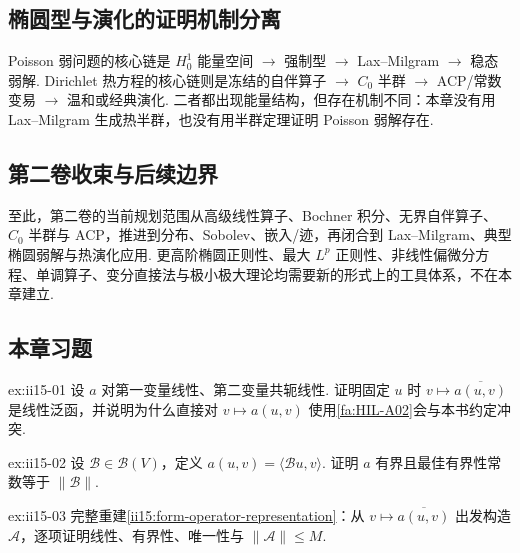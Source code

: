 \subsection{椭圆型与演化的证明机制分离}
Poisson 弱问题的核心链是 \(\displaystyle H_0^1\) 能量空间 \(\displaystyle\to\) 强制型 \(\displaystyle\to\) Lax--Milgram \(\displaystyle\to\) 稳态弱解. Dirichlet 热方程的核心链则是冻结的自伴算子 \(\displaystyle\to\) \(\displaystyle C_0\) 半群 \(\displaystyle\to\) ACP/常数变易 \(\displaystyle\to\) 温和或经典演化. 二者都出现能量结构，但存在机制不同：本章没有用 Lax--Milgram 生成热半群，也没有用半群定理证明 Poisson 弱解存在.

\subsection{第二卷收束与后续边界}
至此，第二卷的当前规划范围从高级线性算子、Bochner 积分、无界自伴算子、\(\displaystyle C_0\) 半群与 ACP，推进到分布、Sobolev、嵌入/迹，再闭合到 Lax--Milgram、典型椭圆弱解与热演化应用. 更高阶椭圆正则性、最大 \(\displaystyle L^p\) 正则性、非线性偏微分方程、单调算子、变分直接法与极小极大理论均需要新的形式上的工具体系，不在本章建立.

\subsection*{本章习题}\label{sec:ii15-exercises}

\begin{FAExercise}[半双线性的约定]{ex:ii15-01}
设 \(\displaystyle a\) 对第一变量线性、第二变量共轭线性. 证明固定 \(\displaystyle u\) 时 \(\displaystyle v\mapsto\overline{a(u,v)}\) 是线性泛函，并说明为什么直接对 \(\displaystyle v\mapsto a(u,v)\) 使用\autoref{fa:HIL-A02}会与本书约定冲突.
\end{FAExercise}

\begin{FAExercise}[型有界性]{ex:ii15-02}
设 \(\displaystyle\mathcal B\in\mathcal B(V)\)，定义 \(\displaystyle a(u,v)=\langle\mathcal Bu,v\rangle\). 证明 \(\displaystyle a\) 有界且最佳有界性常数等于 \(\displaystyle\|\mathcal B\|\).
\end{FAExercise}

\begin{FAExercise}[算子表示]{ex:ii15-03}
完整重建\autoref{ii15:form-operator-representation}：从 \(\displaystyle v\mapsto\overline{a(u,v)}\) 出发构造 \(\displaystyle\mathcal A\)，逐项证明线性、有界性、唯一性与 \(\displaystyle\|\mathcal A\|\leqslant M\).
\end{FAExercise}

